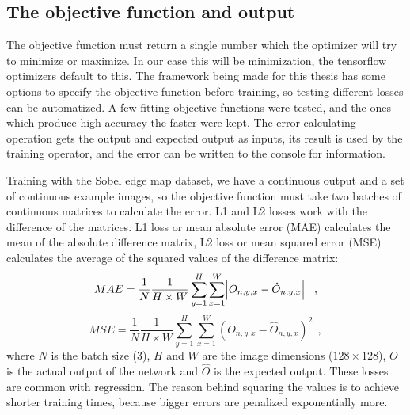 \documentclass[12pt]{report}
\begin{document}
\subsection{The objective function and output}
The objective function must return a single number which the optimizer will try to minimize or maximize. In our case this will be minimization, the tensorflow optimizers default to this. The framework being made for this thesis has some options to specify the objective function before training, so testing different losses can be automatized. A few fitting objective functions were tested, and the ones which produce high accuracy the faster were kept. The error-calculating operation gets the output and expected output as inputs, its result is used by the training operator, and the error can be written to the console for information.

Training with the Sobel edge map dataset, we have a continuous output and a set of continuous example images, so the objective function must take two batches of continuous matrices to calculate the error. L1 and L2 losses work with the difference of the matrices. L1 loss or mean absolute error (MAE) calculates the mean of the absolute difference matrix, L2 loss or mean squared error (MSE) calculates the average of the squared values of the difference matrix:
\begin{equation*}
MAE = \frac{1}{N}\frac{1}{H\times W}\sum_{y=1}^{H}\sum_{x=1}^{W}\abs{O_{n,y,x}-\hat{O}_{n,y,x}}\ \ ,
\end{equation*}
\begin{equation*}
MSE = \frac{1}{N}\frac{1}{H\times W}\sum_{y=1}^{H}\sum_{x=1}^{W}\left(O_{n,y,x}-\hat{O}_{n,y,x}\right)^{2}\ \ ,
\end{equation*}
where $N$ is the batch size ($3$), $H$ and $W$ are the image dimensions ($128\times128$), $O$ is the actual output of the network and $\hat{O}$ is the expected output. These losses are common with regression. The reason behind squaring the values is to achieve shorter training times, because bigger errors are penalized exponentially more.
\end{document}

